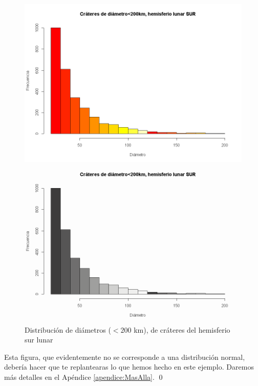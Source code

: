 \begin{ejemplo}
\begin{figure}[ht]
\begin{center}
\begin{enColor}
\includegraphics[width=12cm]{../fig/cap09-cratereslunares.png}
\end{enColor}
\begin{bn}
\includegraphics[width=12cm]{../fig/cap09-cratereslunares-bn.png}
\end{bn}
\caption{Distribución de diámetros ($<200$ km), de cráteres del hemisferio sur lunar}
\label{cap09:fig:CrateresLuna}
\end{center}
\end{figure}

Esta figura, que evidentemente no se corresponde a una distribución normal, debería hacer que te
replantearas lo que hemos hecho en este ejemplo. Daremos más detalles en el Apéndice
\ref{apendice:MasAlla}. \qed
\end{ejemplo}


